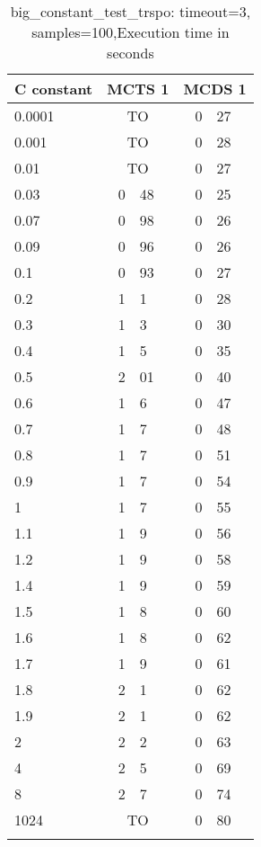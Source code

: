 \begin{table}
    \caption{big_constant_test_trspo: timeout=3, samples=100,Execution time in seconds}
    \begin{tabular}{l*2{r@{.}l}} 
        \toprule
        C constant & \multicolumn{2}{c}{MCTS 1}&\multicolumn{2}{c}{MCDS 1}\\
        \midrule
        0.0001 & \multicolumn{2}{c}{TO} & 0&27\\
        0.001 & \multicolumn{2}{c}{TO} & 0&28\\
        0.01 & \multicolumn{2}{c}{TO} & 0&27\\
        0.03 & 0&48 & 0&25\\
        0.07 & 0&98 & 0&26\\
        0.09 & 0&96 & 0&26\\
        0.1 & 0&93 & 0&27\\
        0.2 & 1&1 & 0&28\\
        0.3 & 1&3 & 0&30\\
        0.4 & 1&5 & 0&35\\
        0.5 & 2&01 & 0&40\\
        0.6 & 1&6 & 0&47\\
        0.7 & 1&7 & 0&48\\
        0.8 & 1&7 & 0&51\\
        0.9 & 1&7 & 0&54\\
        1 & 1&7 & 0&55\\
        1.1 & 1&9 & 0&56\\
        1.2 & 1&9 & 0&58\\
        1.4 & 1&9 & 0&59\\
        1.5 & 1&8 & 0&60\\
        1.6 & 1&8 & 0&62\\
        1.7 & 1&9 & 0&61\\
        1.8 & 2&1 & 0&62\\
        1.9 & 2&1 & 0&62\\
        2 & 2&2 & 0&63\\
        4 & 2&5 & 0&69\\
        8 & 2&7 & 0&74\\
        1024 & \multicolumn{2}{c}{TO} & 0&80\\
        \bottomrule
    \label{big_constant_test_trspo}
    \end{tabular}
\end{table}